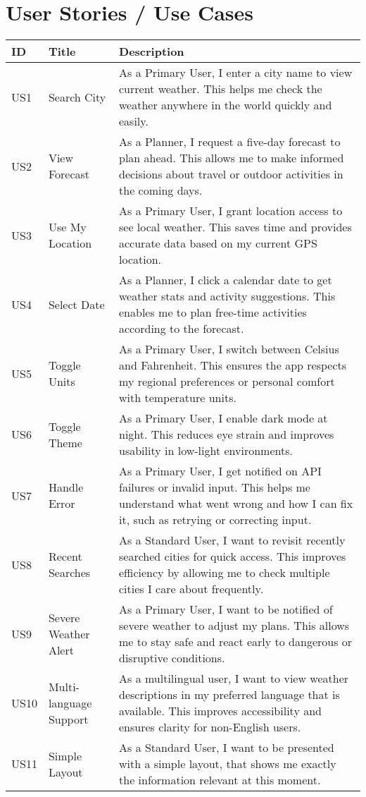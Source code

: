 \documentclass[fontsize=13pt,a4paper]{scrartcl}
\begin{document}
\newpage

\section{User Stories / Use Cases}
\begin{longtable}{|p{1cm}|p{3cm}|p{10cm}|}
\hline
\textbf{ID} & \textbf{Title} & \textbf{Description} \\
\hline
US1 & Search City & As a Primary User, I enter a city name to view current weather. This helps me check the weather anywhere in the world quickly and easily. \\
\hline
US2 & View Forecast & As a Planner, I request a five-day forecast to plan ahead. This allows me to make informed decisions about travel or outdoor activities in the coming days. \\
\hline
US3 & Use My Location & As a Primary User, I grant location access to see local weather. This saves time and provides accurate data based on my current GPS location. \\
\hline
US4 & Select Date & As a Planner, I click a calendar date to get weather stats and activity suggestions. This enables me to plan free-time activities according to the forecast. \\
\hline
US5 & Toggle Units & As a Primary User, I switch between Celsius and Fahrenheit. This ensures the app respects my regional preferences or personal comfort with temperature units. \\
\hline
US6 & Toggle Theme & As a Primary User, I enable dark mode at night. This reduces eye strain and improves usability in low-light environments. \\
\hline
US7 & Handle Error & As a Primary User, I get notified on API failures or invalid input. This helps me understand what went wrong and how I can fix it, such as retrying or correcting input. \\
\hline
US8 & Recent Searches & As a Standard User, I want to revisit recently searched cities for quick access. This improves efficiency by allowing me to check multiple cities I care about frequently. \\
\hline
US9 & Severe Weather Alert & As a Primary User, I want to be notified of severe weather to adjust my plans. This allows me to stay safe and react early to dangerous or disruptive conditions. \\
\hline
US10 & Multi-language Support & As a multilingual user, I want to view weather descriptions in my preferred language that is available. This improves accessibility and ensures clarity for non-English users. \\
\hline
US11 & Simple Layout & As a Standard User, I want to be presented with a simple layout, that shows me exactly the information relevant at this moment.
\end{longtable}
\end{document}
